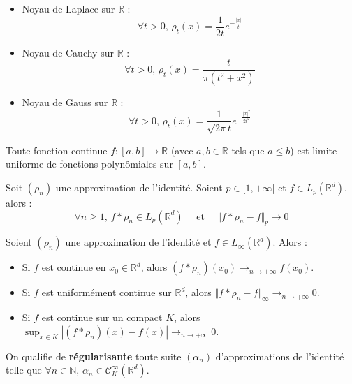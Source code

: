 	\begin{example}
		\begin{itemize}
			\item Noyau de Laplace sur $\mathbb{R}$ :
			\[ \forall t > 0, \, \rho_t(x) = \frac{1}{2t}e^{-\frac{|x|}{t}} \]
			\item Noyau de Cauchy sur $\mathbb{R}$ :
			\[ \forall t > 0, \, \rho_t(x) = \frac{t}{\pi (t^2 + x^2)} \]
			\item Noyau de Gauss sur $\mathbb{R}$ :
			\[ \forall t > 0, \, \rho_t(x) = \frac{1}{\sqrt{2\pi} t}e^{-\frac{|x|^2}{2t^2}} \]
		\end{itemize}
	\end{example}


	\begin{application}
		Toute fonction continue $f : [a,b] \rightarrow \mathbb{R}$ (avec $a, b \in \mathbb{R}$ tels que $a \leq b$) est limite uniforme de fonctions polynômiales sur $[a, b]$.
	\end{application}


	\begin{theorem}
		Soit $(\rho_n)$ une approximation de l'identité. Soient $p \in [1, +\infty[$ et $f \in L_p(\mathbb{R}^d)$, alors :
		\[ \forall n \geq 1, \, f * \rho_n \in L_p(\mathbb{R}^d) \quad \text{ et } \quad \Vert f * \rho_n - f \Vert_p \longrightarrow 0 \]
	\end{theorem}

	\begin{theorem}
		Soient $(\rho_n)$ une approximation de l'identité et $f \in L_\infty(\mathbb{R}^d)$. Alors :
		\begin{itemize}
			\item Si $f$ est continue en $x_0 \in \mathbb{R}^d$, alors $(f * \rho_n)(x_0) \longrightarrow_{n \rightarrow +\infty} f(x_0)$.
			\item Si $f$ est uniformément continue sur $\mathbb{R}^d$, alors $\Vert f * \rho_n - f \Vert_\infty \longrightarrow_{n \rightarrow +\infty} 0$.
			\item Si $f$ est continue sur un compact $K$, alors $\sup_{x \in K} |(f * \rho_n)(x) - f(x)| \longrightarrow_{n \rightarrow +\infty} 0$.
		\end{itemize}
	\end{theorem}

	\begin{definition}
		On qualifie de \textbf{régularisante} toute suite $(\alpha_n)$ d'approximations de l'identité telle que $\forall n \in \mathbb{N}, \, \alpha_n \in \mathcal{C}^\infty_K(\mathbb{R}^d)$.
	\end{definition}

